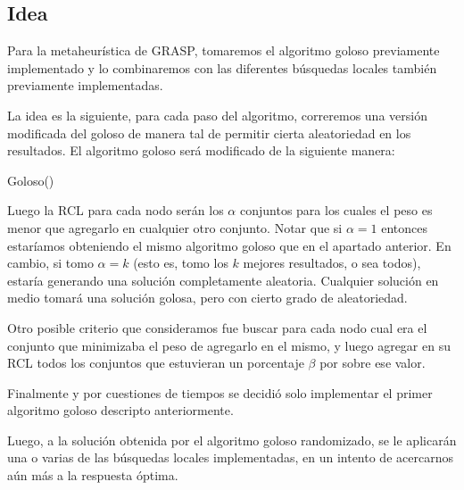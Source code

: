 \subsection{Idea}


Para la metaheurística de GRASP, tomaremos el algoritmo goloso previamente implementado y lo combinaremos con las diferentes búsquedas locales también previamente implementadas.

La idea es la siguiente, para cada paso del algoritmo, correremos una versión modificada del goloso de manera tal de permitir cierta aleatoriedad en los resultados. El algoritmo goloso será modificado de la siguiente manera:

\begin{algorithm}
  \begin{algorithmic}[1]\parskip=1mm
 \caption{ Goloso()}
\end{algorithmic}
\end{algorithm} 

Luego la RCL para cada nodo serán los $\alpha$ conjuntos para los cuales el peso es menor que agregarlo en cualquier otro conjunto. Notar que si $\alpha=1$ entonces estaríamos obteniendo el mismo algoritmo goloso que en el apartado anterior. En cambio, si tomo $\alpha = k$ (esto es, tomo los $k$ mejores resultados, o sea todos), estaría generando una solución completamente aleatoria. Cualquier solución en medio tomará una solución golosa, pero con cierto grado de aleatoriedad.

Otro posible criterio que consideramos fue buscar para cada nodo cual era el conjunto que minimizaba el peso de agregarlo en el mismo, y luego agregar en su RCL todos los conjuntos que estuvieran un porcentaje $\beta$ por sobre ese valor.

Finalmente y por cuestiones de tiempos se decidió solo implementar el primer algoritmo goloso descripto anteriormente.

Luego, a la solución obtenida por el algoritmo goloso randomizado, se le aplicarán una o varias de las búsquedas locales implementadas, en un intento de acercarnos aún más a la respuesta óptima.

